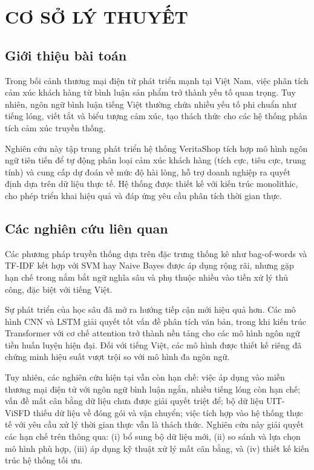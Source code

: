 \newpage
%
%
\section{CƠ SỞ LÝ THUYẾT}\label{sec:theory_support}
\subsection{Giới thiệu bài toán}

Trong bối cảnh thương mại điện tử phát triển mạnh tại Việt Nam, việc phân tích cảm xúc khách hàng từ bình luận sản phẩm trở thành yếu tố quan trọng. Tuy nhiên, ngôn ngữ bình luận tiếng Việt thường chứa nhiều yếu tố phi chuẩn như tiếng lóng, viết tắt và biểu tượng cảm xúc, tạo thách thức cho các hệ thống phân tích cảm xúc truyền thống.

Nghiên cứu này tập trung phát triển hệ thống VeritaShop tích hợp mô hình ngôn ngữ tiên tiến để tự động phân loại cảm xúc khách hàng (tích cực, tiêu cực, trung tính) và cung cấp dự đoán về mức độ hài lòng, hỗ trợ doanh nghiệp ra quyết định dựa trên dữ liệu thực tế. Hệ thống được thiết kế với kiến trúc monolithic, cho phép triển khai hiệu quả và đáp ứng yêu cầu phân tích thời gian thực.
\subsection{Các nghiên cứu liên quan}

Các phương pháp truyền thống dựa trên đặc trưng thống kê như bag-of-words và TF-IDF kết hợp với SVM hay Naive Bayes được áp dụng rộng rãi, nhưng gặp hạn chế trong nắm bắt ngữ nghĩa sâu và phụ thuộc nhiều vào tiền xử lý thủ công, đặc biệt với tiếng Việt.

Sự phát triển của học sâu đã mở ra hướng tiếp cận mới hiệu quả hơn. Các mô hình CNN và LSTM giải quyết tốt vấn đề phân tích văn bản, trong khi kiến trúc Transformer với cơ chế attention trở thành nền tảng cho các mô hình ngôn ngữ tiền huấn luyện hiện đại. Đối với tiếng Việt, các mô hình được thiết kế riêng đã chứng minh hiệu suất vượt trội so với mô hình đa ngôn ngữ.

Tuy nhiên, các nghiên cứu hiện tại vẫn còn hạn chế: việc áp dụng vào miền thương mại điện tử với ngôn ngữ bình luận ngắn, nhiều tiếng lóng còn hạn chế; vấn đề mất cân bằng dữ liệu chưa được giải quyết triệt để; bộ dữ liệu UIT-ViSFD thiếu dữ liệu về đóng gói và vận chuyển; việc tích hợp vào hệ thống thực tế với yêu cầu xử lý thời gian thực vẫn là thách thức. Nghiên cứu này giải quyết các hạn chế trên thông qua: (i) bổ sung bộ dữ liệu mới, (ii) so sánh và lựa chọn mô hình phù hợp, (iii) áp dụng kỹ thuật xử lý mất cân bằng, và (iv) thiết kế kiến trúc hệ thống tối ưu.
